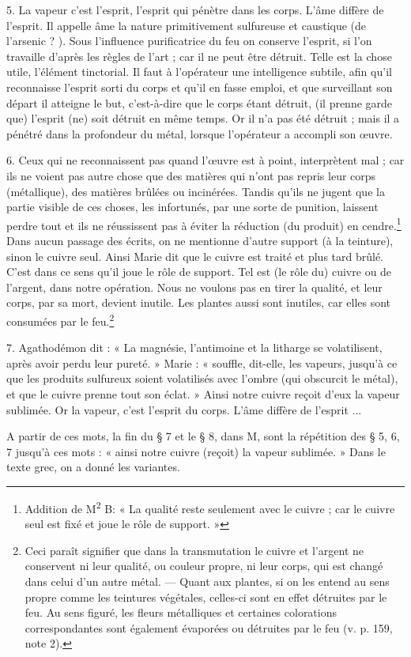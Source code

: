 \documentclass[landscape, a4paper, 11pt, oneside, polutonikogreek, french]{article}
\begin{document}
5. La vapeur c'est l'esprit, l'esprit qui pénètre dans les corps. L'âme diffère de l'esprit. Il appelle âme la nature primitivement sulfureuse et caustique (de l'arsenic ? ). Sous l'influence purificatrice du feu on conserve l'esprit, si l'on travaille d'après les règles de l'art ; car il ne peut être détruit. Telle est la chose utile, l'élément tinctorial. Il faut à l'opérateur une intelligence subtile, afin qu'il reconnaisse l'esprit sorti du corps et qu'il en fasse emploi, et que surveillant son départ il atteigne le but, c'est-à-dire que le corps étant détruit, (il prenne garde que) l'esprit (ne) soit détruit en même temps. Or il n'a pas été détruit ; mais il a pénétré dans la profondeur du métal, lorsque l'opérateur a accompli son œuvre.

6. Ceux qui ne reconnaissent pas quand l'œuvre est à point, interprètent mal ; car ils ne voient pas autre chose que des matières qui n'ont pas repris leur corps (métallique), des matières brûlées ou incinérées. Tandis qu'ils ne jugent que la partie visible de ces choses, les infortunés, par une sorte de punition, laissent perdre tout et ils ne réussissent pas à éviter la réduction (du produit) en cendre.\footnote{Addition de M\textsuperscript{2} B: « La qualité reste seulement avec le cuivre ; car le cuivre seul est fixé et joue le rôle de support. »} Dans aucun passage des écrits, on ne mentionne d'autre support (à la teinture), sinon le cuivre seul. Ainsi Marie dit que le cuivre est traité et plus tard brûlé. C'est dans ce sens qu'il joue le rôle de support. Tel est (le rôle du) cuivre ou de l'argent, dans notre opération. Nous ne voulons pas en tirer la qualité, et leur corps, par sa mort, devient inutile. Les plantes aussi sont inutiles, car elles sont consumées par le feu.\footnote{Ceci paraît signifier que dans la transmutation le cuivre et l'argent ne conservent ni leur qualité, ou couleur propre, ni leur corps, qui est changé dans celui d'un autre métal. --- Quant aux plantes, si on les entend au sens propre comme les teintures végétales, celles-ci sont en effet détruites par le feu. Au sens figuré, les fleurs métalliques et certaines colorations correspondantes sont également évaporées ou détruites par le feu (v. p. 159, note 2).}

7. Agathodémon dit : « La magnésie, l'antimoine et la litharge se volatilisent, après avoir perdu leur pureté. » Marie : « souffle, dit-elle, les vapeurs, jusqu'à ce que les produits sulfureux soient volatilisés avec l'ombre (qui obscurcit le métal), et que le cuivre prenne tout son éclat. » Ainsi notre cuivre reçoit d'eux la vapeur sublimée. Or la vapeur, c'est l'esprit du corps. L'âme diffère de l'esprit ...
\begin{center}
A partir de ces mots, la fin du § 7 et le § 8, dans M, sont la répétition des § 5, 6, 7 jusqu'à ces mots : « ainsi notre cuivre (reçoit) la vapeur sublimée. » Dans le texte grec, on a donné les variantes.
\end{center}
\end{document}
